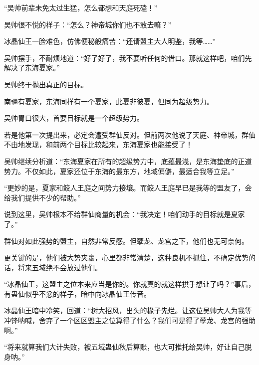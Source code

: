 \begin{this_body}
“吴帅前辈未免太过生猛，怎么都想和天庭死磕！”

吴帅很不悦的样子：“怎么？神帝城你们也不敢去嘛？”

冰晶仙王一脸难色，仿佛便秘般痛苦：“还请盟主大人明鉴，我等……”

吴帅摆手，不耐烦地道：“好了好了，我不要听任何的借口。那就这样吧，咱们先解决了东海夏家。”

吴帅终于抛出真正的目标。

南疆有夏家，东海同样有一个夏家，此夏非彼夏，但同为超级势力。

吴帅胃口很大，首要目标就是一个超级势力。

若是他第一次提出来，必定会遭受群仙反对。但前两次他说了天庭、神帝城，群仙不由地发现，和前两个目标比较起来，东海夏家也能接受了！

吴帅继续分析道：“东海夏家在所有的超级势力中，底蕴最浅，是东海垫底的正道势力。不仅如此，夏家还位于东海的最东方，地域偏僻，最适合我等立足。”

“更妙的是，夏家和鲛人王庭之间势力接壤。而鲛人王庭早已是我等的盟友了，会给我们提供不少的帮助。”

说到这里，吴帅根本不给群仙商量的机会：“我决定！咱们动手的目标就是夏家了。”

群仙对如此强势的盟主，自然非常反感。但孽龙、龙宫之下，他们也无可奈何。

更关键的是，他们被大势夹裹，心里都非常清楚，这种良机不抓住，不确定优势的话，将来五域绝不会放过他们。

“冰晶仙王，这盟主之位本来应当是你的。你就真的就这样拱手想让了吗？”事后，有蛊仙似乎不忿的样子，暗中向冰晶仙王传音。

冰晶仙王暗中冷笑，回道：“树大招风，出头的椽子先烂。让这位吴帅大人为我等冲锋呐喊，舍弃了一个区区盟主之位算得了什么？我们可是得了孽龙、龙宫的强助啊。”

“将来就算我们大计失败，被五域蛊仙秋后算账，也大可推托给吴帅，好让自己脱身呐。”

\end{this_body}

